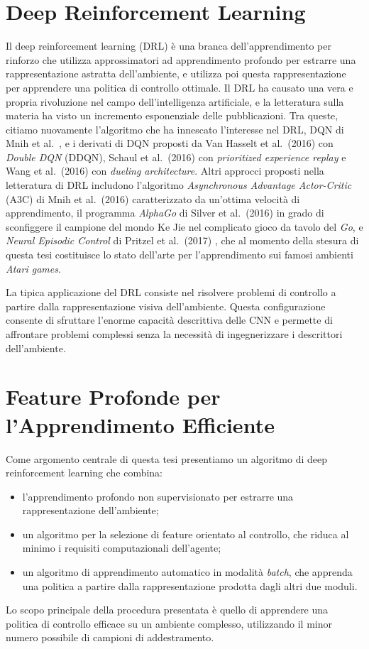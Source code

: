 \section*{Deep Reinforcement Learning}
Il deep reinforcement learning (DRL) \`e una branca dell'apprendimento 
per rinforzo che utilizza approssimatori ad apprendimento profondo per
estrarre una rappresentazione astratta dell'ambiente, e utilizza poi questa
rappresentazione per apprendere una politica di controllo ottimale.
Il DRL ha causato una vera e propria rivoluzione nel campo dell'intelligenza 
artificiale, e la letteratura sulla materia ha visto un incremento esponenziale
delle pubblicazioni.
Tra queste, citiamo nuovamente l'algoritmo che ha innescato l'interesse nel DRL, 
DQN di Mnih et al.\ \cite{mnih2015human}, e i derivati di DQN proposti da Van 
Hasselt et al.\ (2016) \cite{van2016deep} con \textit{Double DQN} (DDQN), Schaul 
et al.\ (2016) \cite{schaul2016prioritized} con \textit{prioritized experience 
replay} e Wang et al.\ (2016) \cite{wang2016dueling} con 
\textit{dueling architecture}. 
Altri approcci proposti nella letteratura di DRL includono l'algoritmo 
\textit{Asynchronous Advantage Actor-Critic} (A3C) di Mnih et al.\ (2016) 
\cite{mnih2016asynchronous} caratterizzato da un'ottima velocit\`a di 
apprendimento, il programma \textit{AlphaGo} di Silver et al.\ (2016) 
\cite{silver2016mastering} in grado di sconfiggere il campione del mondo Ke Jie
nel complicato gioco da tavolo del \textit{Go}, e \textit{Neural Episodic 
Control} di Pritzel et al.\ (2017) \cite{pritzel2017neural}, che al momento
della stesura di questa tesi costituisce lo stato dell'arte per l'apprendimento 
sui famosi ambienti \textit{Atari games}.

La tipica applicazione del DRL consiste nel risolvere problemi di controllo a 
partire dalla rappresentazione visiva dell'ambiente. Questa configurazione 
consente di sfruttare l'enorme capacit\`a descrittiva delle CNN e permette di 
affrontare problemi complessi senza la necessit\`a di ingegnerizzare i
descrittori dell'ambiente. 

\section*{Feature Profonde per l'Apprendimento Efficiente}
Come argomento centrale di questa tesi presentiamo un algoritmo di deep 
reinforcement learning che combina:
\begin{itemize}
    \item l'apprendimento profondo non supervisionato per estrarre una 
    rappresentazione dell'ambiente;
    \item un algoritmo per la selezione di feature orientato al controllo, che 
    riduca al minimo i requisiti computazionali dell'agente;
    \item un algoritmo di apprendimento automatico in modalit\`a \textit{batch}, 
    che apprenda una politica a partire dalla rappresentazione prodotta dagli 
    altri due moduli.
\end{itemize}
Lo scopo principale della procedura presentata \`e quello di apprendere una
politica di controllo efficace su un ambiente complesso, utilizzando il minor
numero possibile di campioni di addestramento. 

